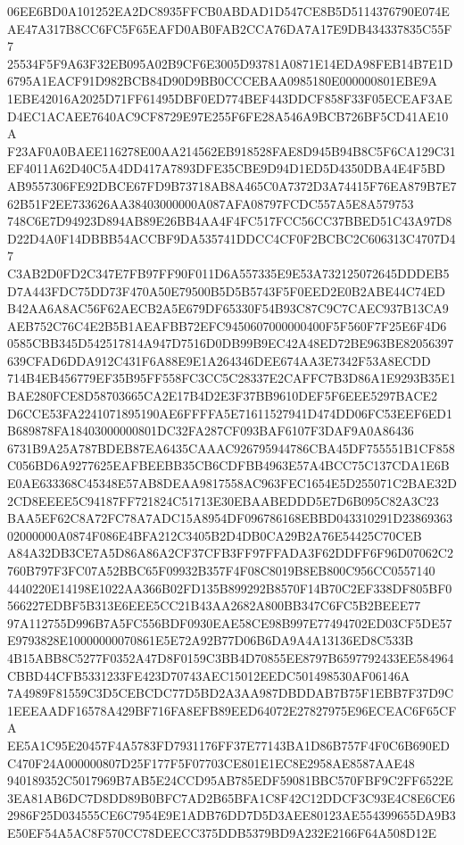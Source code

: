 \documentclass[UTF8,fontset=fandol,zihao=-4,a4paper]{ctexart}
\begin{document}
{{06EE6BD0A101252EA2DC8935FFCB0ABDAD1D547CE8B5D5114376790E074EAE47A317B8CC6FC5F65EAFD0AB0FAB2CCA76DA7A17E9DB434337835C55F7
25534F5F9A63F32EB095A02B9CF6E3005D93781A0871E14EDA98FEB14B7E1D6795A1EACF91D982BCB84D90D9BB0CCCEBAA0985180E000000801EBE9A
1EBE42016A2025D71FF61495DBF0ED774BEF443DDCF858F33F05ECEAF3AED4EC1ACAEE7640AC9CF8729E97E255F6FE28A546A9BCB726BF5CD41AE10A
F23AF0A0BAEE116278E00AA214562EB918528FAE8D945B94B8C5F6CA129C31EF4011A62D40C5A4DD417A7893DFE35CBE9D94D1ED5D4350DBA4E4F5BD
AB9557306FE92DBCE67FD9B73718AB8A465C0A7372D3A74415F76EA879B7E762B51F2EE733626AA38403000000A087AFA08797FCDC557A5E8A579753
748C6E7D94923D894AB89E26BB4AA4F4FC517FCC56CC37BBED51C43A97D8D22D4A0F14DBBB54ACCBF9DA535741DDCC4CF0F2BCBC2C606313C4707D47
C3AB2D0FD2C347E7FB97FF90F011D6A557335E9E53A732125072645DDDEB5D7A443FDC75DD73F470A50E79500B5D5B5743F5F0EED2E0B2ABE44C74ED
B42AA6A8AC56F62AECB2A5E679DF65330F54B93C87C9C7CAEC937B13CA9AEB752C76C4E2B5B1AEAFBB72EFC9450607000000400F5F560F7F25E6F4D6
0585CBB345D542517814A947D7516D0DB99B9EC42A48ED72BE963BE82056397639CFAD6DDA912C431F6A88E9E1A264346DEE674AA3E7342F53A8ECDD
714B4EB456779EF35B95FF558FC3CC5C28337E2CAFFC7B3D86A1E9293B35E1BAE280FCE8D58703665CA2E17B4D2E3F37BB9610DEF5F6EEE5297BACE2
D6CCE53FA2241071895190AE6FFFFA5E71611527941D474DD06FC53EEF6ED1B689878FA18403000000801DC32FA287CF093BAF6107F3DAF9A0A86436
6731B9A25A787BDEB87EA6435CAAAC926795944786CBA45DF755551B1CF858C056BD6A9277625EAFBEEBB35CB6CDFBB4963E57A4BCC75C137CDA1E6B
E0AE633368C45348E57AB8DEAA9817558AC963FEC1654E5D255071C2BAE32D2CD8EEEE5C94187FF721824C51713E30EBAABEDDD5E7D6B095C82A3C23
BAA5EF62C8A72FC78A7ADC15A8954DF096786168EBBD043310291D2386936302000000A0874F086E4BFA212C3405B2D4DB0CA29B2A76E54425C70CEB
A84A32DB3CE7A5D86A86A2CF37CFB3FF97FFADA3F62DDFF6F96D07062C2760B797F3FC07A52BBC65F09932B357F4F08C8019B8EB800C956CC0557140
4440220E14198E1022AA366B02FD135B899292B8570F14B70C2EF338DF805BF0566227EDBF5B313E6EEE5CC21B43AA2682A800BB347C6FC5B2BEEE77
97A112755D996B7A5FC556BDF0930EAE58CE98B997E77494702ED03CF5DE57E9793828E10000000070861E5E72A92B77D06B6DA9A4A13136ED8C533B
4B15ABB8C5277F0352A47D8F0159C3BB4D70855EE8797B6597792433EE584964CBBD44CFB5331233FE423D70743AEC15012EEDC501498530AF06146A
7A4989F81559C3D5CEBCDC77D5BD2A3AA987DBDDAB7B75F1EBB7F37D9C1EEEAADF16578A429BF716FA8EFB89EED64072E27827975E96ECEAC6F65CFA
EE5A1C95E20457F4A5783FD7931176FF37E77143BA1D86B757F4F0C6B690EDC470F24A000000807D25F177F5F07703CE801E1EC8E2958AE8587AAE48
940189352C5017969B7AB5E24CCD95AB785EDF59081BBC570FBF9C2FF6522E3EA81AB6DC7D8DD89B0BFC7AD2B65BFA1C8F42C12DDCF3C93E4C8E6CE6
2986F25D034555CE6C7954E9E1ADB76DD7D5D3AEE80123AE554399655DA9B3E50EF54A5AC8F570CC78DEECC375DDB5379BD9A232E2166F64A508D12E
}}
\end{document}

